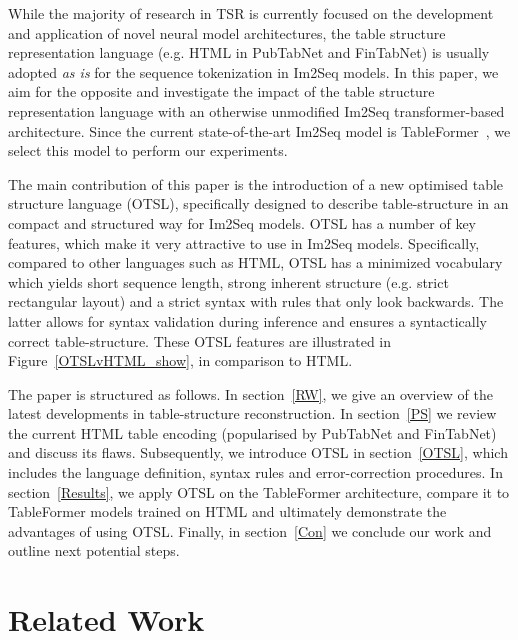 \documentclass[runningheads]{llncs}
\begin{document}
While the majority of research in TSR is currently focused on the development and application of novel neural model architectures, the table structure representation language (e.g. HTML in PubTabNet and FinTabNet) is usually adopted \textit{as is} for the sequence tokenization in Im2Seq models. In this paper, we aim for the opposite and investigate the impact of the table structure representation language with an otherwise unmodified Im2Seq transformer-based architecture. Since the current state-of-the-art Im2Seq model is TableFormer~\cite{TableFormer}, we select this model to perform our experiments.

The main contribution of this paper is the introduction of a new optimised table structure language (OTSL), specifically designed to describe table-structure in an compact and structured way for Im2Seq models. OTSL has a number of key features, which make it very attractive to use in Im2Seq models. Specifically, compared to other languages such as HTML, OTSL has a minimized vocabulary which yields short sequence length, strong inherent structure (e.g. strict rectangular layout) and a strict syntax with rules that only look backwards. The latter allows for syntax validation during inference and ensures a syntactically correct table-structure. These OTSL features are illustrated in Figure~\ref{OTSLvHTML_show}, in comparison to HTML. 

The paper is structured as follows. In section~\ref{RW}, we give an overview of the latest developments in table-structure reconstruction. In section~\ref{PS} we review the current HTML table encoding (popularised by PubTabNet and FinTabNet) and discuss its flaws. Subsequently, we introduce OTSL in section~\ref{OTSL}, which includes the language definition, syntax rules and error-correction procedures. In section~\ref{Results}, we apply OTSL on the TableFormer architecture, compare it to TableFormer models trained on HTML and ultimately demonstrate the advantages of using OTSL. Finally, in section~\ref{Con} we conclude our work and outline next potential steps.  

\section{\label{RW}Related Work}
\end{document}
